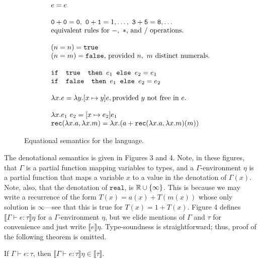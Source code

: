 \begin{figure}
\[
\begin{array}{lr}
e = e \\ \\
\texttt{0} + \texttt{0} = \texttt{0}, \ \texttt{0} + \texttt{1} = 1, \ldots, \ \texttt{3} + \texttt{5} = \texttt{8}, \ldots  \\
\text{equivalent rules for } -, \ * \text{, and } /\text{ operations.}
\\ \\
(n =n) = \texttt{true} \\ (n=m) = \texttt{false}\text{, provided } n, \ m \text{ distinct numerals.}\\ \\ 
\ifelse{\texttt{ true }}{e_1}{e_2} = e_1 \\
\ifelse{\texttt{ false }}{e_1}{e_2} = e_2 \\ \\ 
\lambda x.e = \lambda y.[x \mapsto y]e, \text{provided } y \text{ not free in } e. \\ \\ 
\lambda x.e_1 \ e_2 = [x \mapsto e_2]e_1 \\
\texttt{rec}(\lambda x.a, \lambda x.m) = 
			\lambda x.(a + \texttt{rec}(\lambda x.a, \lambda x.m)(m)) 
\end{array}
\]
\caption{Equational semantics for the language.}
\label{fig:eqsem}
\end{figure}

The denotational semantics is given in Figures 3 and 4. Note, in these figures, that $\Gamma$ is a partial function mapping variables to types, and a
 $\Gamma$-environment $\eta$ is a partial function that maps a variable $x$ to a value in the
 denotation of $\Gamma(x)$. Note, also, that the denotation of $\texttt{real}$, is $\mathbb{R} \cup \{\infty\}$. This is because
 we may write a recurrence of the form $T(x) = a(x) + T(m(x))$ whose only solution is $\infty$---see that this is true
 for $T(x) = 1 + T(x)$.
 Figure 4 defines $\llbracket \Gamma \vdash e: \tau\rrbracket\eta$ for 
a $\Gamma$-environment $\eta$, but we elide mentions of $\Gamma$ and $\tau$ for convenience and just write
$\llbracket e\rrbracket\eta$. Type-soundness is straightforward; thus, proof of the following theorem is omitted.

\begin{thm}
If $\Gamma \vdash e:\tau$, then $\llbracket \Gamma \vdash e : \tau \rrbracket\eta \in \llbracket \tau \rrbracket$.
\end{thm}

